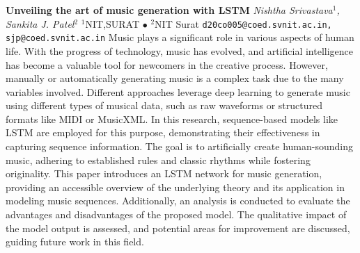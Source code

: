
    \begin{conf-abstract}[]
        {\textbf{Unveiling the art of music generation with LSTM}}
        {\textit{Nishtha  Srivastava$^{1}$, Sankita J. Patel$^{2}$}}
        {$^{1}$NIT,SURAT $\bullet$ $^{2}$NIT Surat}
        {\texttt{d20co005@coed.svnit.ac.in, sjp@coed.svnit.ac.in}}
        {Music plays a significant role in various aspects of human life. With the progress of technology, music has evolved, and artificial intelligence has become a valuable tool for newcomers in the creative process. However, manually or automatically generating music is a complex task due to the many variables involved. Different approaches leverage deep learning to generate music using different types of musical data, such as raw waveforms or structured formats like MIDI or MusicXML. In this research, sequence-based models like LSTM are employed for this purpose, demonstrating their effectiveness in capturing sequence information. The goal is to artificially create human-sounding music, adhering to established rules and classic rhythms while fostering originality. This paper introduces an LSTM network for music generation, providing an accessible overview of the underlying theory and its application in modeling music sequences. Additionally, an analysis is conducted to evaluate the advantages and disadvantages of the proposed model. The qualitative impact of the model output is assessed, and potential areas for improvement are discussed, guiding future work in this field.}
    \end{conf-abstract}
        